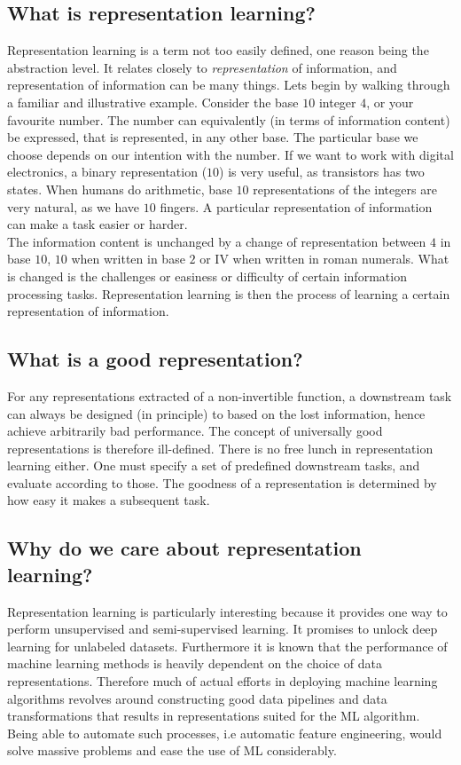 \documentclass[../../thesis.tex]{subfiles}
\begin{document}
\subsection{What is representation learning?}
Representation learning is a term not too easily defined, one reason being the abstraction level. It relates closely to \textit{representation} of information, and representation of information can be many things. Lets begin by walking through a familiar and illustrative example. Consider the base $10$ integer $4$, or your favourite number. The number can equivalently (in terms of information content) be expressed, that is represented, in any other base. The particular base we choose depends on our intention with the number. If we want to work with digital electronics, a binary representation ($10$) is very useful, as transistors has two states. When humans do arithmetic, base $10$ representations of the integers are very natural, as we have $10$ fingers. A particular representation of information can make a task easier or harder.
\\ The information content is unchanged by a change of representation between $4$ in base $10$, $10$ when written in base $2$ or \RN{4} when written in roman numerals. What is changed is the challenges or easiness or difficulty of certain information processing tasks. Representation learning is then the process of learning a certain representation of information. 

\subsection{What is a good representation?}

For any representations extracted of a non-invertible function, a downstream task can always be designed (in principle) to based on the lost information, hence achieve arbitrarily bad performance. The concept of universally good representations is therefore ill-defined. There is no free lunch in representation learning either. One must specify a set of predefined downstream tasks, and evaluate according to those. The goodness of a representation is determined by how easy it makes a subsequent task.

\subsection{Why do we care about representation learning?}

Representation learning is particularly interesting because it provides one way to perform unsupervised and semi-supervised learning. It promises to unlock deep learning for unlabeled datasets. Furthermore it is known that the performance of machine learning methods is heavily dependent on the choice of data representations. Therefore much of actual efforts in deploying machine learning algorithms revolves around constructing good data pipelines and data transformations that results in representations suited for the ML algorithm. Being able to automate such processes, i.e automatic feature engineering, would solve massive problems and ease the use of ML considerably. 
\end{document}
